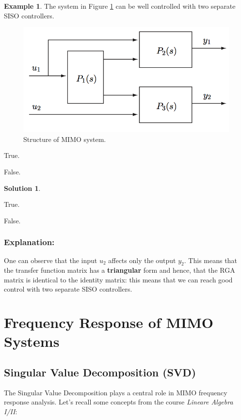 \documentclass[a4paper,12 pt]{article}
\numberwithin{equation}{section}
\theoremstyle{definition}
\newtheorem{bsp}{Example}
\theoremstyle{remark}
\theoremstyle{definition}
\newtheorem*{lsg}{Solution}
\theoremstyle{definition}
\theoremstyle{definition}
\theoremstyle{remark}
\newcommand{\cmark}{\ding{51}}%
\newcommand{\done}{\rlap{$\square$}{\raisebox{2pt}{\large\hspace{1pt}\cmark}}%
\hspace{-2.5pt}}
\begin{document}
\begin{bsp}
The system in Figure \ref{fig:mcrga} can be well controlled with two separate SISO controllers.
\begin{figure}[ht]
\begin{center}
\includegraphics[width=0.65\columnwidth]{mcrga}
\caption{Structure of MIMO system.}
\label{fig:mcrga}
\end{center}
\end{figure}

\begin{todolist}
 \item True.
 \item False.
\end{todolist}
\newpage
\begin{lsg}
\ 
\begin{todolist}
 \item [\done] True.
 \item False.
\end{todolist}
\subsubsection*{Explanation:}
One can observe that the input $u_2$ affects only the output $y_2$. This means that the transfer function matrix has a \textbf{triangular} form and hence, that the RGA matrix is identical to the identity matrix: this means that we can reach good control with two separate SISO controllers.


\end{lsg}


\end{bsp}



\newpage
\section{Frequency Response of MIMO Systems}
\subsection{Singular Value Decomposition (SVD)}
The Singular Value Decomposition plays a central role in MIMO frequency response analysis. Let's recall some concepts from the course \textit{Lineare Algebra I/II}:
\end{document}
